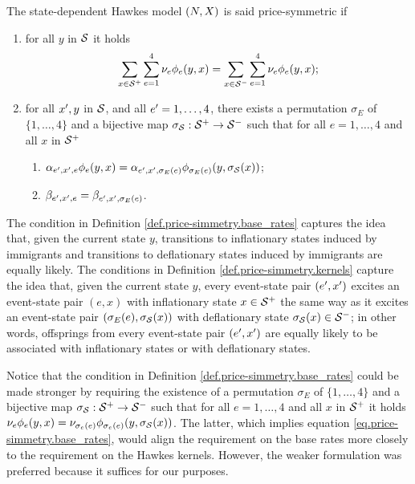 \documentclass[10pt, article,table]{article}
\begin{document}
\begin{defi}\label{def.price-simmetry}
 The state-dependent Hawkes model $(N,X)$ is said price-symmetric if 
 \begin{enumerate}[label={\roman{*}.} , ref={\ref{def.price-simmetry}.\roman{*}}]
 \item\label{def.price-simmetry.base_rates}
 for all $y$ in $\mathcal{S}$ it holds
 \begin{equation}\label{eq.price-simmetry.base_rates}
  \sum_{x\in\mathcal{S}^{+}}\sum_{e=1}^{4}\nu_{e}\phi_{e}(y,x)
  =
  \sum_{x\in\mathcal{S}^{-}}\sum_{e=1}^{4}\nu_{e}\phi_{e}(y,x);
 \end{equation}
\item\label{def.price-simmetry.kernels}
for all $x^{\prime},y$ in $\mathcal{S}$, and  all $e^{\prime} = 1,\dots,4$, there exists a permutation $\sigma_{E}$ of $\lbrace 1,\dots,4\rbrace$ and a bijective map $\sigma_{\mathcal{S}} : \mathcal{S}^{+}\rightarrow\mathcal{S}^{-}$ such that for all $e=1,\dots,4$ and all $x$ in $\mathcal{S}^{+}$
\begin{enumerate}%
\item $\alpha_{e^{\prime},x^{\prime},e}\phi_{e}(y,x) = \alpha_{e^{\prime},x^{\prime},\sigma_{E}(e)} \phi_{\sigma_{E}(e)}(y,\sigma_{\mathcal{S}}(x))$;
\item $\beta_{e^{\prime},x^{\prime},e} = \beta_{e^{\prime},x^{\prime},\sigma_{E}(e)}$.
\end{enumerate}
\end{enumerate}
\end{defi}
The condition in Definition \ref{def.price-simmetry.base_rates}  captures the idea that, given the current state $y$, 
transitions to inflationary states induced by immigrants and transitions to deflationary states induced by immigrants are equally likely.
The conditions in Definition \ref{def.price-simmetry.kernels} capture the idea that, given the current state $y$, every event-state pair $(e^{\prime},x^{\prime})$ excites an  event-state pair $(e,x)$ with inflationary state $x\in\mathcal{S}^{+}$  the same way as it excites an event-state pair $(\sigma_{E}(e),\sigma_{\mathcal{S}}(x))$ with deflationary state $\sigma_{\mathcal{S}}(x) \in\mathcal{S}^{-}$; in other words, offsprings from every event-state pair $(e^{\prime},x^{\prime})$ are equally likely to be associated with inflationary states or with deflationary states. 

Notice that the condition in Definition \ref{def.price-simmetry.base_rates} could be made stronger by requiring the existence of a permutation $\sigma_E$ of $\lbrace 1,\dots,4\rbrace$ and a bijective map $\sigma_{\mathcal{S}} : \mathcal{S}^{+}\rightarrow\mathcal{S}^{-}$ such that for all $e=1,\dots,4$ and all $x$ in $\mathcal{S}^{+}$ it holds $\nu_{e}\phi_{e}(y,x) = \nu_{\sigma_{e}(e)}\phi_{\sigma_{e}(e)}(y,\sigma_{\mathcal{S}}(x))$. The latter, which  implies equation \eqref{eq.price-simmetry.base_rates}, would align the requirement on the base rates more closely to the requirement on the Hawkes kernels. However, the weaker formulation was preferred because it suffices for our purposes. 
\end{document}
